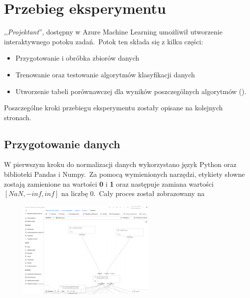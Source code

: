 

\section{Przebieg eksperymentu}

,,\textit{Projektant}'', dostępny w Azure Machine Learning umożliwił utworzenie interaktywnego potoku zadań.\ Potok ten składa się z kilku części:
\begin{itemize}
    \item Przygotowanie i obróbka zbiorów danych
    \item Trenowanie oraz testowanie algorytmów klasyfikacji danych
    \item Utworzenie tabeli porównawczej dla wyników poszczególnych algorytmów ().
\end{itemize}

Poszczególne kroki przebiegu eksperymentu zostały opisane na kolejnych stronach.

\subsection{Przygotowanie danych}
W pierwszym kroku do normalizacji danych wykorzystano język Python oraz biblioteki Pandas i Numpy.\ Za pomocą wymienionych narzędzi, etykiety słowne zostają zamienione na wartości \textbf{0} i \textbf{1} oraz następuje zamiana wartości $[NaN, -inf, inf]$ na liczbę $0$.\ Cały proces został zobrazowany na 

\begin{figure}[H]
    \centering
    \includegraphics[width=0.6\textwidth]{images/data_pipe}
    \label{fig:norm}
\end{figure}

